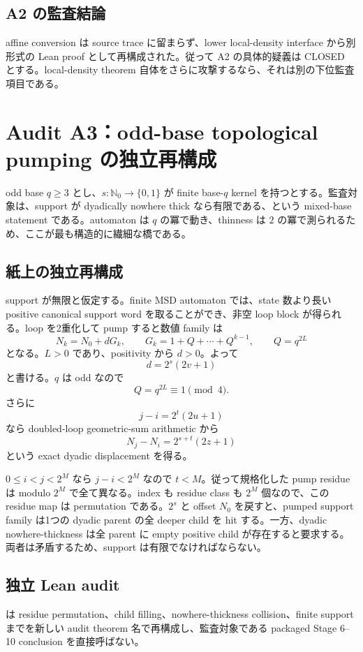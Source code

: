 \documentclass[a4paper,11pt]{ltjsarticle}
\newcommand{\Nzero}{\mathbb{N}_0}
\newcommand{\code}[1]{\path{#1}}
\begin{document}
\subsection{A2 の監査結論}

affine conversion は source trace に留まらず、lower local-density interface から別形式の Lean proof として再構成された。従って A2 の具体的疑義は CLOSED とする。local-density theorem 自体をさらに攻撃するなら、それは別の下位監査項目である。
\section{Audit A3：odd-base topological pumping の独立再構成}

odd base $q\ge3$ とし、$s:\Nzero\to\{0,1\}$ が finite base-$q$ kernel を持つとする。監査対象は、support が dyadically nowhere thick なら有限である、という mixed-base statement である。automaton は $q$ の冪で動き、thinness は $2$ の冪で測られるため、ここが最も構造的に繊細な橋である。

\subsection{紙上の独立再構成}

support が無限と仮定する。finite MSD automaton では、state 数より長い positive canonical support word を取ることができ、非空 loop block が得られる。loop を2重化して pump すると数値 family は
\[
N_k=N_0+dG_k,
\qquad
G_k=1+Q+\cdots+Q^{k-1},
\qquad Q=q^{2L}
\]
となる。$L>0$ であり、positivity から $d>0$。よって
\[
d=2^s(2v+1)
\]
と書ける。$q$ は odd なので
\[
Q=q^{2L}\equiv1\pmod4.
\]
さらに
\[
j-i=2^t(2u+1)
\]
なら doubled-loop geometric-sum arithmetic から
\[
N_j-N_i=2^{s+t}(2z+1)
\]
という exact dyadic displacement を得る。

$0\le i<j<2^M$ なら $j-i<2^M$ なので $t<M$。従って規格化した pump residue は modulo $2^M$ で全て異なる。index も residue class も $2^M$ 個なので、この residue map は permutation である。$2^s$ と offset $N_0$ を戻すと、pumped support family は1つの dyadic parent の全 deeper child を hit する。一方、dyadic nowhere-thickness は全 parent に empty positive child が存在すると要求する。両者は矛盾するため、support は有限でなければならない。

\subsection{独立 Lean audit}

\begin{center}\code{ARCA3IndependentAudit.lean}\end{center}
は residue permutation、child filling、nowhere-thickness collision、finite support までを新しい audit theorem 名で再構成し、監査対象である packaged Stage 6--10 conclusion を直接呼ばない。
\end{document}
